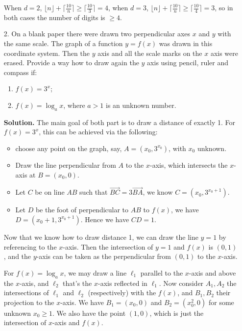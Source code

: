 \documentclass[11pt,a4paper]{article}
\begin{document}
\begin{enumerate}
	    When $d=2$, $\lfloor n\rfloor + \lceil \frac{10}{n} \rceil \ge \lceil \frac{10}{3} \rceil =4$, 
	    when $d=3$, $\lfloor n\rfloor + \lceil \frac{10}{n} \rceil \ge \lceil \frac{10}{4} \rceil =3$, 
	    so in both cases the number of digits is $\ge 4$. 
		
		\item [2.]
		On a blank paper there were drawn two perpendicular axes $x$ and $y$ with the same scale.
		The graph of a function $y = f(x)$ was drawn in this coordinate system. Then the $y$ axis
		and all the scale marks on the $x$ axis were erased. Provide a way how to draw again the
		$y$ axis using pencil, ruler and compass if:
		\begin{enumerate}
			\item $f(x)=3^x$; 
			\item $f(x)=\log_a x$, where $a>1$ is an unknown number. 
		\end{enumerate}
	    
	    \textbf{Solution.} 
	    The main goal of both part is to draw a distance of exactly 1. 
	    For $f(x)=3^x$, this can be achieved via the following: 
	    \begin{itemize}
	    	\item choose any point on the graph, say, $A=(x_0, 3^{x_0})$, with $x_0$ unknown.  
	    	
	    	\item Draw the line perpendicular from $A$ to the $x$-axis, which intersects the $x$-axis at $B=(x_0, 0)$. 
	    	
	    	\item Let $C$ be on line $AB$ such that $\vec{BC}=3\vec{BA}$, we know $C=(x_0, 3^{x_0+1})$. 
	    	
	    	\item Let $D$ be the foot of perpendicular to $AB$ to $f(x)$, we have $D=(x_0+1, 3^{x_0+1})$. Hence we have $CD=1$. 
	    \end{itemize}
        Now that we know how to draw distance 1, we can draw the line $y=1$ by referencing to the $x$-axis. 
        Then the intersection of $y=1$ and $f(x)$ is $(0, 1)$, 
        and the $y$-axis can be taken as the perpendicular from $(0, 1)$ to the $x$-axis. 
        
        For $f(x)=\log_a x$, we may draw a line $\ell_1$ parallel to the $x$-axis and above the $x$-axis, and $\ell_2$ that's the $x$-axis reflected in $\ell_1$. 
        Now consider $A_1, A_2$ the intersections of $\ell_1$ and $\ell_2$ (respectively) with the $f(x)$, 
        and $B_1, B_2$ their projection to the $x$-axis. 
        We have $B_1=(x_0, 0)$ and $B_2=(x_0^2, 0)$ for some unknown $x_0 \ge 1$. 
        We also have the point $(1, 0)$, which is just the intersection of $x$-axis and $f(x)$. 
        

\end{enumerate}
\end{document}
